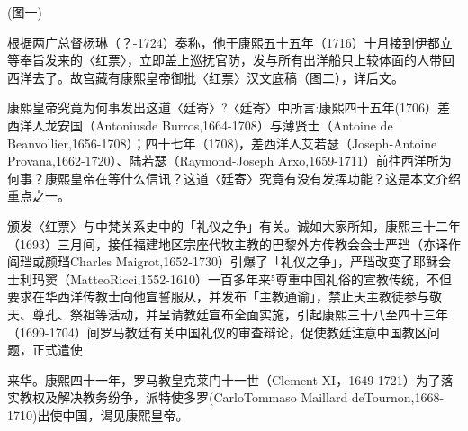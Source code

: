 (图一)


\vfill
\begin{BookNotes}
\end{BookNotes}


\noindent 根据两广总督杨琳（？-1724）奏称，他于康熙五十五年（1716）十月接到伊都立等奉旨发来的〈红票〉，立即盖上巡抚官防，发与所有出洋船只上较体面的人带回西洋去了。故宫藏有康熙皇帝御批〈红票〉汉文底稿（图二），详后文。



康熙皇帝究竟为何事发出这道〈廷寄〉?〈廷寄〉中所言:康熙四十五年(1706）差西洋人龙安国（Antoniusde Burros,1664-1708）与薄贤士（Antoine de Beanvollier,1656-1708）；四十七年（1708)，差西洋人艾若瑟（Joseph-Antoine Provana,1662-1720）、陆若瑟（Raymond-Joseph Arxo,1659-1711）前往西洋所为何事？康熙皇帝在等什么信讯？这道〈廷寄〉究竟有没有发挥功能？这是本文介绍重点之一。


颁发〈红票〉与中梵关系史中的「礼仪之争」有关。诚如大家所知，康熙三十二年（1693）三月间，接任福建地区宗座代牧主教的巴黎外方传教会会士严珰（亦译作阎珰或颜珰Charles Maigrot,1652-1730）引爆了「礼仪之争」，严珰改变了耶稣会士利玛窦（MatteoRicci,1552-1610）一百多年来⁵尊重中国礼俗的宣教传统，不但要求在华西洋传教士向他宣誓服从，并发布「主教通谕」，禁止天主教徒参与敬天、尊孔、祭祖等活动，并呈请教廷宣布全面实施，引起康熙三十八至四十三年（1699-1704）间罗马教廷有关中国礼仪的审查辩论，促使教廷注意中国教区问题，正式遣使

\vfill
\begin{BookNotes}
\end{BookNotes}


\noindent 来华。康熙四十一年，罗马教皇克莱门十一世（Clement XI，1649-1721）为了落实教权及解决教务纷争，派特使多罗(CarloTommaso Maillard deTournon,1668-1710)出使中国，谒见康熙皇帝。

